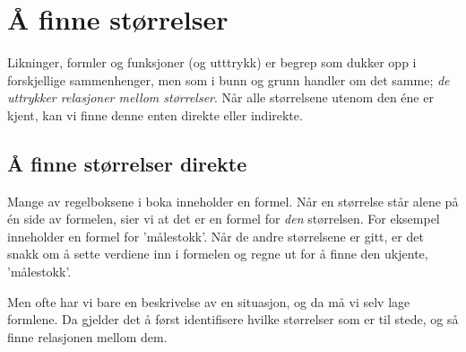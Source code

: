 



\section{Å finne størrelser}
Likninger, formler og funksjoner (og utttrykk) er begrep som dukker opp i forskjellige sammenhenger, men som i bunn og grunn handler om det samme; \textsl{de uttrykker relasjoner mellom størrelser}. Når alle størrelsene utenom den éne er kjent, kan vi finne denne enten direkte eller indirekte.\vsk

\subsection{Å finne størrelser direkte}
Mange av regelboksene i boka inneholder en formel. Når en størrelse står alene på én side av formelen, sier vi at det er en formel for \textsl{den} størrelsen. For eksempel inneholder  en formel for 'målestokk'. Når de andre størrelsene er gitt, er det snakk om å sette verdiene inn i formelen og regne ut for å finne den ukjente,  'målestokk'.  \vsk

Men ofte har vi bare en beskrivelse av en situasjon, og da må vi selv lage formlene. Da gjelder det å først identifisere hvilke størrelser som er til stede, og så finne relasjonen mellom dem.\regv
{}
